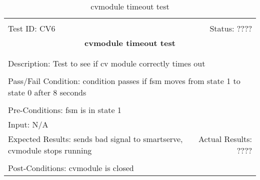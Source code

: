 \documentclass[11pt]{article}
\begin{document}
\begin{center}
\begin{table}[H]
\begin{tabular}{|l r|}\hline&\\[-2mm]
	Test ID: CV6	&Status: ????\\[-3mm]
	\multicolumn{2}{|c|}{\textbf{\large{cvmodule timeout test}}}\\&\\\hline&\\[-3mm]
	\multicolumn{2}{|p{\textwidth}|}{Description: Test to see if cv module correctly times out }\\[1mm]\hline&\\[-3mm]
	\multicolumn{2}{|p{\textwidth}|}{Pass/Fail Condition: condition passes if fsm moves from state 1 to state 0 after 8 seconds}\\[1mm]\hline&\\[-3mm]
	\multicolumn{2}{|p{\textwidth}|}{Pre-Conditions: fsm is in state 1}\\[4mm]
	\multicolumn{2}{|p{\textwidth}|}{Input: N/A}\\[2mm]\hline
	\multicolumn{1}{|p{0.49\textwidth}}{Expected Results: sends bad signal to smartserve, cvmodule stops running}	&\multicolumn{1}{|p{0.45\textwidth}|}{Actual Results: ????}\\\hline&\\[-3mm]
	\multicolumn{2}{|p{\textwidth}|}{Post-Conditions: cvmodule is closed}\\\hline
\end{tabular}
\caption{cvmodule timeout test}
\end{table}
\end{center}
\end{document}
